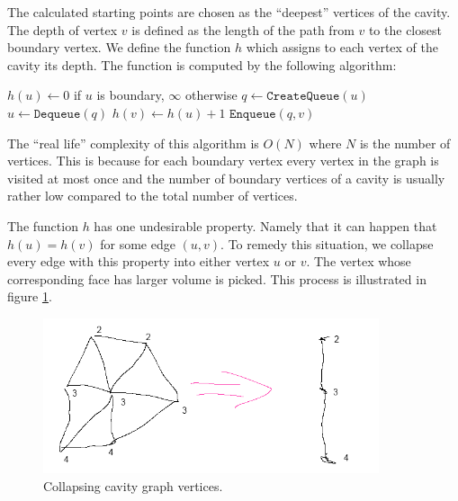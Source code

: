 \documentclass[11pt]{article} %
\begin{document}
The calculated starting points are chosen as the ``deepest'' vertices of the cavity. The depth of vertex $v$ is defined as the length of the path from $v$ to the closest boundary vertex. We define the function $h$ which assigns to each vertex of the cavity its depth. The function is computed by the following algorithm:

\renewcommand{\algorithmiccomment}[1]{// #1}
\begin{algorithm}[h]
  \begin{algorithmic}
	\State $h(u)\gets 0$ if $u$ is boundary, $\infty$ otherwise
  \EndFor
	\State $q \gets \mathtt{CreateQueue}(u)$ 
	  \State $u\gets \mathtt{Dequeue}(q)$ 
	   
	       \State $h(v)\gets h(u) + 1$
		  \State $\mathtt{Enqueue}(q, v)$ 
		\EndIf
	  \EndFor
	\EndWhile
  \EndFor
  \end{algorithmic}
\end{algorithm}

The ``real life'' complexity of this algorithm is $O(N)$ where $N$ is the number of vertices. This is because for each boundary vertex every vertex in the graph is visited at most once and the number of boundary vertices of a cavity is usually rather low compared to the total number of vertices.

The function $h$ has one undesirable property. Namely that it can happen that $h(u)=h(v)$ for some edge $(u,v)$. To remedy this situation, we collapse every edge with this property into either vertex $u$ or $v$. The vertex whose corresponding face has larger volume is picked. This process is illustrated in figure \ref{fig:collapse}.

\begin{figure}[h]
\centering\includegraphics[width=0.88\textwidth]{collapse}
\caption{Collapsing cavity graph vertices.}
\label{fig:collapse}
\end{figure}
\end{document}
